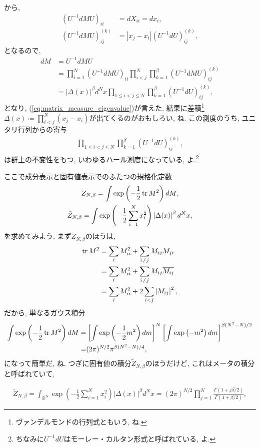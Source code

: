 \documentclass{ltjsarticle}
\theoremstyle{definition}
\begin{document}
から,
\begin{align}
  \left(U^{-1}dMU\right)_{ii}&=dX_{ii}=dx_i,\\
  \left(U^{-1}dMU\right)_{ij}^{(k)}&=\left|x_j-x_i\right|\left(U^{-1}dU\right)_{ij}^{(k)},
\end{align}
となるので,
\begin{align}
  dM&=U^{-1}dMU\\
  &=\prod_{i=1}^N\left(U^{-1}dMU\right)_{ii}\prod_{i<j}^N\prod_{k=1}^\beta\left(U^{-1}dMU\right)_{ij}^{(k)}\\
  &=\left|\Delta(x)\right|^\beta d^Nx\prod_{1\le i<j\le N}\prod_{k=1}^\beta\left(U^{-1}dU\right)_{ij}^{(k)},\label{eq:matrix_measure_result}
\end{align}
となり, (\ref{eq:matrix_measure_eigenvalue})が言えた. 結果に差積\footnote{ヴァンデルモンドの行列式ともいう, ね.}$\Delta(x)\coloneqq\prod_{i<j}^N(x_j-x_i)$が出てくるのがおもしろい, ね. この測度のうち, ユニタリ行列からの寄与
\begin{gather}
  \prod_{1\le i<j\le N}\prod_{k=1}^\beta\left(U^{-1}dU\right)_{ij}^{(k)},
\end{gather}
は群上の不変性をもつ, いわゆるハール測度になっている, よ.\footnote{ちなみに$U^{-1}dU$はモーレー・カルタン形式と呼ばれている, よ.}\par
ここで成分表示と固有値表示でのふたつの規格化定数
\begin{gather}
  Z_{N,\beta}=\int\exp\left(-\frac12\tr M^2\right)dM,\\
  \tilde Z_{N,\beta}=\int\exp\left(-\frac12\sum_{i=1}^Nx_i^2\right)\left|\Delta(x)\right|^\beta d^Nx,
\end{gather}
を求めてみよう. まず$Z_{N,\beta}$のほうは,
\begin{align}
  \tr M^2&=\sum_iM_{ii}^2+\sum_{i\ne j}M_{ij}M_{ji}\\
  &=\sum_iM_{ii}^2+\sum_{i\ne j}M_{ij}\overline{M_{ij}}\\
  &=\sum_iM_{ii}^2+2\sum_{i<j}\left|M_{ij}\right|^2,
\end{align}
だから, 単なるガウス積分
\begin{align}
  \int\exp\left(-\frac12\tr M^2\right)dM
  =&\left[\int\exp\left(-\frac12m^2\right)dm\right]^N\left[\int\exp\left(-m^2\right)dm\right]^{\beta(N^2-N)/2}\\
  =&(2\pi)^{N/2}\pi^{\beta(N^2-N)/4},
\end{align}
になって簡単だ, ね. つぎに固有値の積分$\tilde Z_{N,\beta}$のほうだけど, これはメータの積分と呼ばれていて,
\begin{tcolorbox}
  \begin{align}
    \tilde Z_{N,\beta}=\int_{\mathbb R^N}\exp\left(-\frac12\sum_{i=1}^Nx_i^2\right)\left|\Delta(x)\right|^\beta d^Nx=(2\pi)^{N/2}\prod_{j=1}^N\frac{\Gamma(1+j\beta/2)}{\Gamma(1+\beta/2)},
  \end{align}
\end{tcolorbox}
\end{document}
